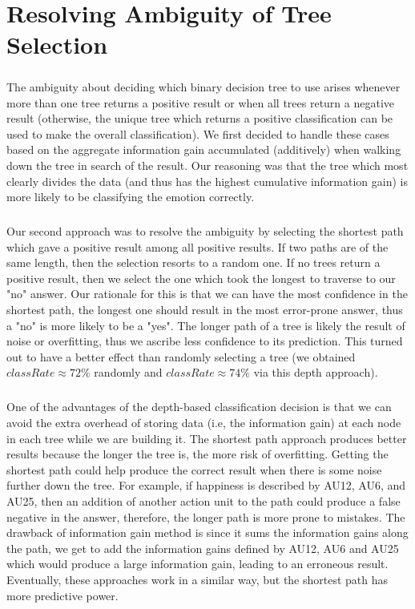 \documentclass[a4paper,12pt,oneside,final]{report}
\begin{document}
\chapter{Resolving Ambiguity of Tree Selection}
\label{ch:ambig}
\paragraph{}
The ambiguity about deciding which binary decision tree to use arises whenever more than one tree returns a positive result or when all trees return a negative result (otherwise, the unique tree which returns a positive classification can be used to make the overall classification).  We first decided to handle these cases based on the aggregate information gain accumulated (additively) when walking down the tree in search of the result.  Our reasoning was that the tree which most clearly divides the data (and thus has the highest cumulative information gain) is more likely to be classifying the emotion correctly. 

\paragraph{}
Our second approach was to resolve the ambiguity by selecting the shortest path which gave a positive result among all positive results. If two paths are of the same length, then the selection resorts to a random one.  If no trees return a positive result, then we select the one which took the longest to traverse to our "no" answer.  Our rationale for this is that we can have the most confidence in the shortest path, the longest one should result in the most error-prone answer, thus a "no" is more likely to be a "yes".  The longer path of a tree is likely the result of noise or overfitting, thus we ascribe less confidence to its prediction.  This turned out to have a better effect than randomly selecting a tree (we obtained $classRate \approx 72\%$ randomly and $classRate \approx 74\%$ via this depth approach).
\paragraph{}
One of the advantages of the depth-based classification decision is that we can avoid the extra overhead of storing data (i.e, the information gain) at each node in each tree while we are building it.  The shortest path approach produces better results because the longer the tree is, the more risk of overfitting. Getting the shortest path could help produce the correct result when there is some noise further down the tree. For example, if happiness is described by AU12, AU6, and AU25, then an addition of another action unit to the path could produce a false negative in the answer, therefore, the longer path is more prone to mistakes. The drawback of information gain method is since it sums the information gains along the path, we get to add the information gains defined by AU12, AU6 and AU25 which would produce a large information gain, leading to an erroneous result. Eventually, these approaches work in a similar way, but the shortest path has more predictive power.
\end{document}
